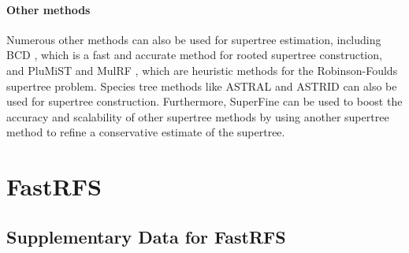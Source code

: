 \documentclass[tocnosub,noragright,centerchapter,fullpagesingle,12pt]{uiuc_csthesis18}
\begin{document}
\subsubsection{Other methods}

Numerous other methods can also be used for supertree estimation, including BCD \cite{fleischauer2017bad}, which is a fast and accurate method for rooted supertree construction, and PluMiST \cite{plumist} and MulRF \cite{mulrf}, which are heuristic methods for the Robinson-Foulds supertree problem. Species tree methods like ASTRAL \cite{mirarab2015astral} and ASTRID \cite{vachaspati2015astrid} can also be used for supertree construction. Furthermore, SuperFine \cite{superfine} can be used to boost the accuracy and scalability of other supertree methods by using another supertree method to refine a conservative estimate of the supertree.





\chapter[FastRFS]{FastRFS\protect\footnotemark}
\label{chapter:fastrfs}

\section{Supplementary Data for FastRFS}

\end{document}

